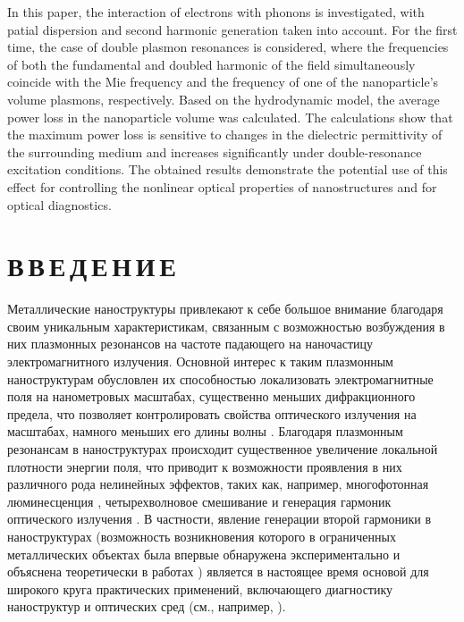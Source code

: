 \documentclass[12pt, a4paper]{article}
\begin{document}
In this paper, the interaction of electrons with phonons is investigated, with  patial dispersion and second harmonic generation taken into account.
For the first time, the case of double plasmon resonances is considered, where the frequencies of both the fundamental and doubled harmonic of the field simultaneously coincide with the Mie frequency and the frequency of one of the nanoparticle's volume plasmons, respectively.
Based on the hydrodynamic model, the average power loss in the nanoparticle volume was calculated.
The calculations show that the maximum power loss is sensitive to changes in the dielectric permittivity of the surrounding medium and increases significantly under double-resonance excitation conditions.
The obtained results demonstrate the potential use of this effect for controlling the nonlinear optical properties of nanostructures and for optical diagnostics.\\



\newpage

\section*{В\,В\,Е\,Д\,Е\,Н\,И\,Е}

Металлические наноструктуры привлекают к себе большое внимание благодаря своим уникальным характеристикам, связанным с возможностью возбуждения в них плазмонных резонансов на частоте падающего на наночастицу электромагнитного излучения.
Основной интерес к таким плазмонным наноструктурам обусловлен их способностью локализовать электромагнитные поля на нанометровых масштабах, существенно меньших дифракционного предела, что позволяет контролировать свойства оптического излучения на масштабах, намного меньших его длины волны \cite{Mai2007, Gram2010}.
Благодаря плазмонным резонансам в наноструктурах происходит существенное увеличение локальной плотности энергии поля, что приводит к возможности проявления в них различного рода нелинейных эффектов, таких как, например, многофотонная люминесценция \cite{Cas2011,biagioni2012,chen2021, ko2011}, четырехволновое смешивание \cite{danckwerts2007, harutyunyan2012, paspalakis2014, singh2016} и генерация гармоник оптического излучения \cite{drobyh2020, smirnova2014, TorresTorres2010}.
В частности, явление генерации второй гармоники в наноструктурах  (возможность возникновения которого в ограниченных металлических объектах была впервые обнаружена экспериментально и объяснена теоретически в работах \cite{franken1961, Bloembergen1962}) является в настоящее время основой для широкого круга практических применений, включающего диагностику наноструктур и оптических сред (см., например, \cite{butet2015, Butet2012}).
\end{document}
